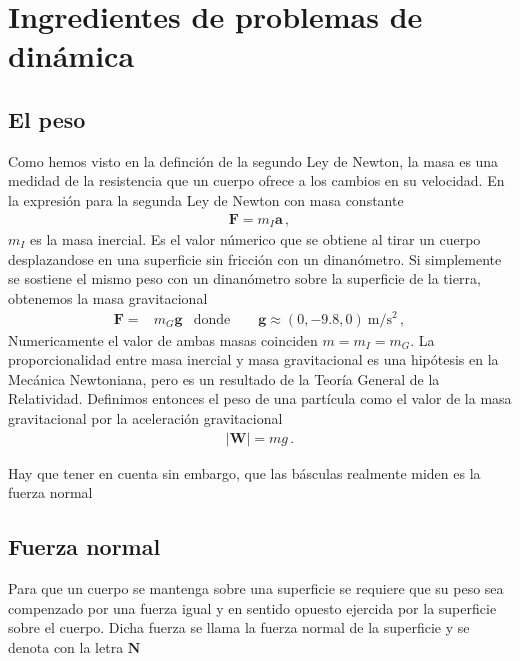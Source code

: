 \section{Ingredientes de problemas de dinámica}

\subsection{El peso}
Como hemos visto en la definción de la segundo Ley de Newton, la masa es una medidad de la resistencia que un cuerpo ofrece a los cambios en su velocidad. En la expresión para la segunda Ley de Newton con masa constante
\begin{align}
  \mathbf{F}=m_I \mathbf{a}\,,
\end{align}
$m_I$ es la masa inercial. Es el valor númerico que se obtiene al tirar un cuerpo desplazandose en una superficie sin fricción con un dinanómetro. Si simplemente se sostiene el mismo peso con un dinanómetro sobre la superficie de la tierra, obtenemos la masa gravitacional
\begin{align}
  \mathbf{F}=&m_G\mathbf{g}&\text{donde}\qquad \mathbf{g}\approx(0,-9.8,0)\ \text{m}/\text{s}^2\,,
\end{align}
Numericamente el valor de ambas masas coinciden $m=m_I=m_G$. La proporcionalidad entre masa inercial y masa gravitacional es una hipótesis en la Mecánica Newtoniana, pero es un resultado de la Teoría General de la Relatividad. Definimos entonces el peso de una partícula como el valor de la masa gravitacional por la aceleración gravitacional
\begin{align}
  |\mathbf{W}|=mg\,.
\end{align}

Hay que tener en cuenta sin embargo, que las básculas realmente miden es la fuerza normal

\subsection{Fuerza normal}
Para que un cuerpo se mantenga sobre una superficie se requiere que su peso sea compenzado por una fuerza igual y en sentido opuesto ejercida por la superficie sobre el cuerpo. Dicha fuerza se llama la fuerza normal de la superficie y se denota con la letra $\mathbf{N}$


